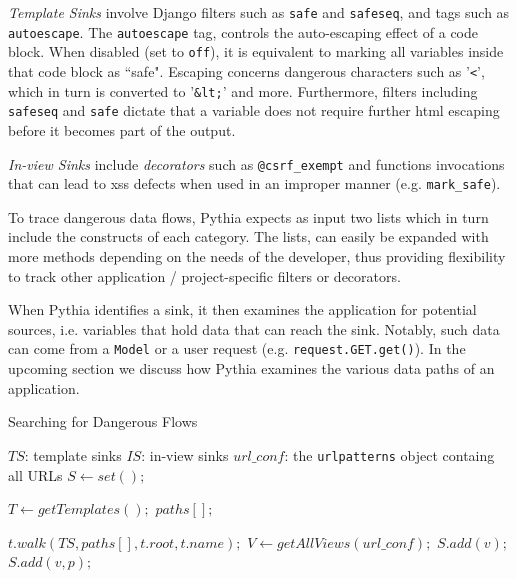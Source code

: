 {\it Template Sinks} involve Django filters
such as {\tt safe} and {\tt safeseq},
and tags such as {\tt autoescape}.
The {\tt autoescape} tag,
controls the auto-escaping effect of a code block.
When disabled (set to {\tt off}),
it is equivalent to marking all variables
inside that code block as ``safe".
Escaping concerns dangerous characters
such as '{\tt <}', which in turn is 
converted to '{\tt \&lt;}' and more.
Furthermore,
filters including {\tt safeseq} and
{\tt safe} dictate that a variable
does not require further {\sc html} escaping
before it becomes part of  the output.

{\it In-view Sinks} include {\it decorators}
such as {\tt @csrf\_exempt} and functions
invocations that can lead to {\sc xss}
defects when used in an improper manner
(e.g. {\tt mark\_safe}).

To trace dangerous data flows,
Pythia expects as input two lists which in turn
include the constructs of each category.
The lists, can easily be expanded with more methods 
depending on the needs of the developer,
thus providing flexibility to track other 
application / project-specific filters
or decorators.

When Pythia identifies a sink,
it then examines the application
for potential sources,
i.e. variables that hold data that
can reach the sink.
Notably,
such data can come from a {\tt Model}
or a user request
(e.g. {\tt request.GET.get()}).
In the upcoming section we discuss
how Pythia examines the various data paths
of an application.

\begin{algorithm}[b]
\caption{Searching for Dangerous Flows}
\label{alg:explore}
\begin{algorithmic}[1]
 $TS$: template sinks
 $IS$: in-view sinks
 $url\_conf$: the {\tt urlpatterns} object containg all URLs
\State $S \gets set();$

\State $T \gets getTemplates();$
\State $paths[];$

    \State $t.walk(TS, paths[], t.root, t.name);$
\EndFor
\State $V \gets getAllViews(url\_conf);$
        \State $S.add(v);$
    \EndIf
            \State $S.add(v, p);$
        \EndIf
    \EndFor 
\EndFor
\EndFunction
\end{algorithmic}
\end{algorithm}

